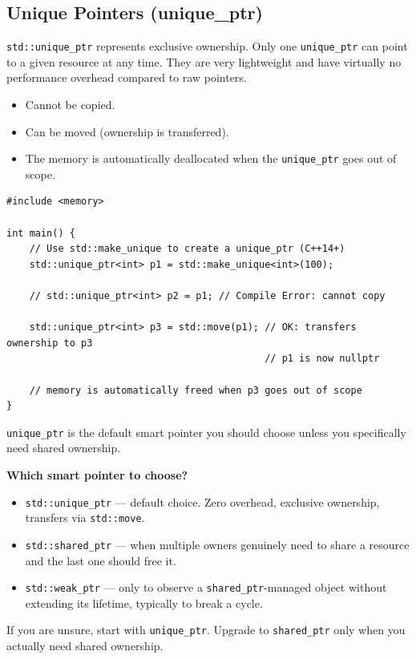 \subsection{Unique Pointers (unique\_ptr)}
\texttt{std::unique\_ptr} represents exclusive ownership. Only one \texttt{unique\_ptr} can point to a given resource at any time. They are very lightweight and have virtually no performance overhead compared to raw pointers.
\begin{itemize}
    \item Cannot be copied.
    \item Can be moved (ownership is transferred).
    \item The memory is automatically deallocated when the \texttt{unique\_ptr} goes out of scope.
\end{itemize}
\begin{lstlisting}
#include <memory>

int main() {
	// Use std::make_unique to create a unique_ptr (C++14+)
	std::unique_ptr<int> p1 = std::make_unique<int>(100);

	// std::unique_ptr<int> p2 = p1; // Compile Error: cannot copy

	std::unique_ptr<int> p3 = std::move(p1); // OK: transfers ownership to p3
	                                         // p1 is now nullptr

	// memory is automatically freed when p3 goes out of scope
}
\end{lstlisting}
\texttt{unique\_ptr} is the default smart pointer you should choose unless you specifically need shared ownership.

\begin{remark}
	\textbf{Which smart pointer to choose?}
	\begin{itemize}
		\item \texttt{std::unique\_ptr} — default choice. Zero overhead, exclusive ownership, transfers via \texttt{std::move}.
		\item \texttt{std::shared\_ptr} — when multiple owners genuinely need to share a resource and the last one should free it.
		\item \texttt{std::weak\_ptr} — only to observe a \texttt{shared\_ptr}-managed object without extending its lifetime, typically to break a cycle.
	\end{itemize}
	If you are unsure, start with \texttt{unique\_ptr}. Upgrade to \texttt{shared\_ptr} only when you actually need shared ownership.
\end{remark}

